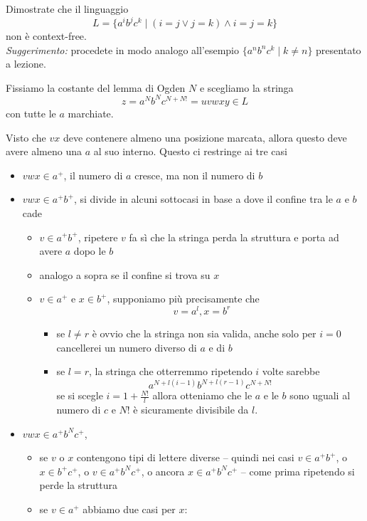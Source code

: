 \documentclass[12pt, answers]{exam}
\begin{document}
\begin{questions}
	\question  Dimostrate che il linguaggio
	$$ L = \{ a^i b^j c^k \mid (i = j \vee j = k) \wedge i = j = k \} $$
	non è context-free.\\
	\textit{Suggerimento:} procedete in modo analogo all'esempio $\{a^n b^n c^k \mid k \neq n \}$ presentato a lezione.	
	\begin{solution}
		Fissiamo la costante del lemma di Ogden $N$ e scegliamo la stringa
			$$ z = a^N b^N c^{N + N!} = uvwxy \in L$$
		con tutte le $a$ marchiate.

		Visto che $vx$ deve contenere almeno una posizione marcata, allora questo deve avere almeno una $a$ al suo interno.
	Questo ci restringe ai tre casi
	\begin{itemize}
		\item $vwx \in a^+$, il numero di $a$ cresce, ma non il numero di $b$
		\item $vwx \in a^+ b^+$, si divide in alcuni sottocasi in base a dove il confine tra le $a$ e $b$ cade
			\begin{itemize}
				\item $v \in a^+ b^+$, ripetere $v$ fa sì che la stringa perda la struttura e porta ad avere $a$ dopo le $b$
				\item analogo a sopra se il confine si trova su $x$
				\item $v \in a^+$ e $x \in b^+$, supponiamo più precisamente che
					$$ v = a^l, x = b^r $$
					\begin{itemize}
						\item se $l \neq r$ è ovvio che la stringa non sia valida, anche solo per $i = 0$ cancellerei un numero diverso di $a$ e di $b$
						\item se $l = r$, la stringa che otterremmo ripetendo $i$ volte sarebbe
							$$ a^{N + l(i - 1)} b^{N + l(r - 1)} c^{N + N!} $$
							se si scegle $i = 1 + \frac{N!}{l}$ allora otteniamo che le $a$ e le $b$ sono uguali al numero di $c$ e $N!$ è sicuramente divisibile da $l$.
					\end{itemize}
			\end{itemize}
		\item $vwx \in a^+ b^N c^+ $, 
			\begin{itemize}
				\item se $v$ o $x$ contengono tipi di lettere diverse -- quindi nei casi $v \in a^+ b^+$, o $x \in b^+ c^+$, o $v \in a^+ b^N c^+$, o ancora $x \in a^+ b^N c^+$ -- come prima ripetendo si perde la struttura
				\item se $v \in a^+$ abbiamo due casi per $x$:

\end{itemize}
\end{itemize}
\end{solution}
\end{questions}
\end{document}

